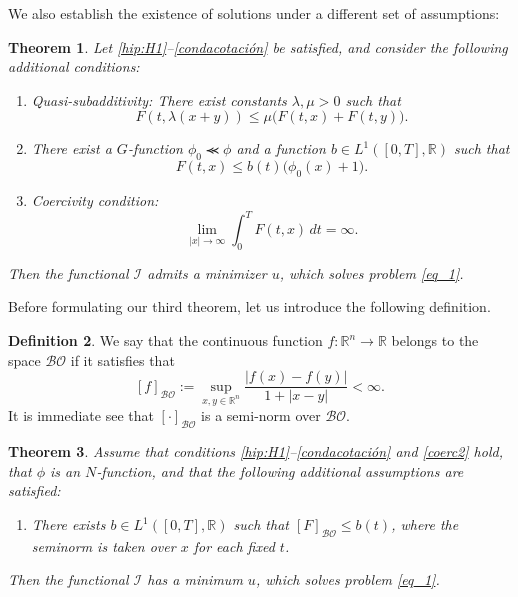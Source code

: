 \documentclass[twoside]{article}
\makeatletter
\theoremstyle{definition}
\newtheorem{definition}{Definition}[section]
\theoremstyle{plain}
\newtheorem{teo}[definition]{Theorem}
\theoremstyle{remark}
\newcommand{\labitem}[2]{%
\def\@itemlabel{\textnormal{\textbf{(#1)}}}
\item
\def\@currentlabel{\textnormal{\textbf{(#1)}}}\label{#2}}
\makeatother
\begin{document}
We also establish the existence of solutions under a different set of assumptions:

\begin{teo}\label{coercuasi}Let \ref{hip:H1}--\ref{condacotación} be satisfied, and consider the following additional conditions:
\begin{enumerate}
    \labitem{H6}{cuasisub} \textit{Quasi-subadditivity:} There exist constants $\lambda, \mu > 0$ such that
    \[
    F(t, \lambda(x+y)) \leq \mu \big(F(t,x) + F(t,y)\big).
    \]
    \labitem{H7}{phiceromenor} There exist a $G$-function $\phi_0 \llcurly \phi$ and a function $b \in L^1([0,T],\mathbb{R})$ such that
    \[
    F(t,x) \leq b(t)\big(\phi_0(x) + 1\big).
    \]
    \labitem{H8}{coerc2} \textit{Coercivity condition:}
    \begin{equation}\label{condcoermedia}
    \lim_{|x| \to \infty} \int_0^T F(t,x)\,dt = \infty.
    \end{equation}
\end{enumerate}
Then the functional $\mathcal{I}$ admits a minimizer $u$, which solves problem \eqref{eq_1}.
\end{teo}

Before formulating our third theorem, let us introduce the following definition.





\begin{definition}\label{def:bo}
We say that the continuous function  $f:\mathbb{R}^n \to \mathbb{R}$ belongs to the space  $\mathcal{BO}$ if it satisfies that
\[[f]_{\mathcal{BO}}:=\sup_{x, y \in\mathbb{R}^n}\frac{|f(x)-f(y)|}{1+|x-y|}<\infty.\]
It is immediate see that $[\cdot]_{\mathcal{BO}}$ is a semi-norm over  $\mathcal{BO}$.
\end{definition}



\begin{teo}\label{coerBO}Assume that conditions \ref{hip:H1}–\ref{condacotación} and \ref{coerc2} hold, that $\phi$ is an $N$‑function, and that the following additional assumptions are satisfied:

\begin{enumerate}
     \labitem{H9}{it:BO} \label{inec38} There exists $ b \in L^1([0,T], \mathbb{R})$ such that
    $[F]_{\mathcal{BO}}\leq b(t)$,  where the seminorm is taken over $x$ for each fixed $t$.
\end{enumerate}
Then  the functional $\mathcal{I}$ has a minimum $u$, which solves problem \eqref{eq_1}.

\end{teo}
\end{document}
